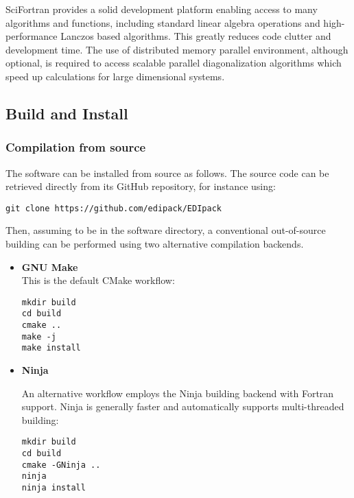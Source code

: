 \documentclass[edipack_sp.tex]{subfiles}
\begin{document}
SciFortran provides a solid development platform enabling access to
many algorithms and functions, including standard linear algebra
operations and high-performance Lanczos based algorithms. This
greatly reduces code clutter and development time.
The use of distributed memory parallel environment, although optional,
is required to access scalable parallel diagonalization algorithms
which speed up calculations for large dimensional systems. 

\subsection{Build and Install}\label{sSecInstallBuildInstall}
\subsubsection{Compilation from source}
The software can be installed from source as follows. The source code can
be retrieved directly from its GitHub repository, for instance using:
\begin{lstlisting}[style=mybash]
git clone https://github.com/edipack/EDIpack 
\end{lstlisting}
Then, assuming to be in the software directory, a conventional
out-of-source building can be performed using two alternative compilation backends.

\begin{itemize}
  \item {\bf GNU Make}\\
This is the default CMake workflow:
\begin{lstlisting}[style=mybash]
mkdir build
cd build
cmake ..
make -j
make install
\end{lstlisting}


\item{\bf Ninja}

An alternative workflow employs the Ninja building backend with
Fortran support. Ninja is generally faster and automatically supports
multi-threaded building:
\begin{lstlisting}[style=mybash]
mkdir build
cd build
cmake -GNinja ..
ninja
ninja install
\end{lstlisting}
\end{itemize}
\end{document}
